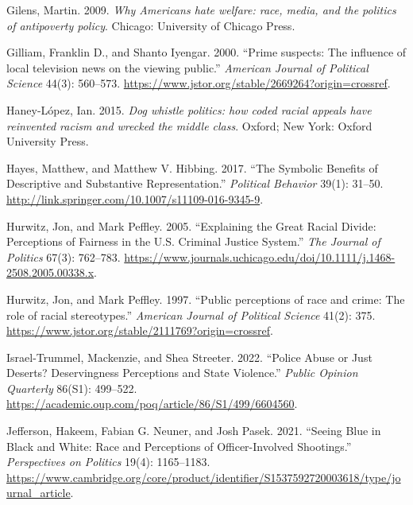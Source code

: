\documentclass[
  12pt,
]{article}
\newlength{\cslhangindent}
\newlength{\cslentryspacingunit} %
\newenvironment{CSLReferences}[2] %
 {%
  \setlength{\parindent}{0pt}
  \ifodd #1
  \let\oldpar\par
  \def\par{\hangindent=\cslhangindent\oldpar}
  \fi
  \setlength{\parskip}{#2\cslentryspacingunit}
 }%
 {}
\begin{document}
\begin{CSLReferences}{1}{0}
\leavevmode{}%
Gilens, Martin. 2009. \emph{Why Americans hate welfare: race, media, and
the politics of antipoverty policy}. Chicago: University of Chicago
Press.

\leavevmode{}%
Gilliam, Franklin D., and Shanto Iyengar. 2000. {``Prime suspects: The
influence of local television news on the viewing public.''}
\emph{American Journal of Political Science} 44(3): 560--573.
\url{https://www.jstor.org/stable/2669264?origin=crossref}.

\leavevmode{}%
Haney-López, Ian. 2015. \emph{Dog whistle politics: how coded racial
appeals have reinvented racism and wrecked the middle class}. Oxford;
New York: Oxford University Press.

\leavevmode{}%
Hayes, Matthew, and Matthew V. Hibbing. 2017. {``The Symbolic Benefits
of Descriptive and Substantive Representation.''} \emph{Political
Behavior} 39(1): 31--50.
\url{http://link.springer.com/10.1007/s11109-016-9345-9}.

\leavevmode{}%
Hurwitz, Jon, and Mark Peffley. 2005. {``Explaining the Great Racial
Divide: Perceptions of Fairness in the U.S. Criminal Justice System.''}
\emph{The Journal of Politics} 67(3): 762--783.
\url{https://www.journals.uchicago.edu/doi/10.1111/j.1468-2508.2005.00338.x}.

\leavevmode{}%
Hurwitz, Jon, and Mark Peffley. 1997. {``Public perceptions of race and
crime: The role of racial stereotypes.''} \emph{American Journal of
Political Science} 41(2): 375.
\url{https://www.jstor.org/stable/2111769?origin=crossref}.

\leavevmode{}%
Israel-Trummel, Mackenzie, and Shea Streeter. 2022. {``Police Abuse or
Just Deserts? Deservingness Perceptions and State Violence.''}
\emph{Public Opinion Quarterly} 86(S1): 499--522.
\url{https://academic.oup.com/poq/article/86/S1/499/6604560}.

\leavevmode{}%
Jefferson, Hakeem, Fabian G. Neuner, and Josh Pasek. 2021. {``Seeing
Blue in Black and White: Race and Perceptions of Officer-Involved
Shootings.''} \emph{Perspectives on Politics} 19(4): 1165--1183.
\url{https://www.cambridge.org/core/product/identifier/S1537592720003618/type/journal_article}.


\end{CSLReferences}
\end{document}
